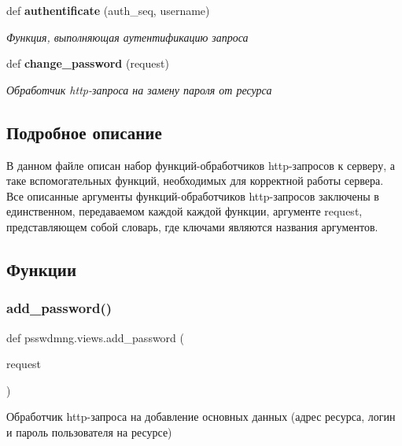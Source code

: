 \begin{DoxyCompactItemize}
def \textbf{ authentificate} (auth\+\_\+seq, username)
\begin{DoxyCompactList}\small\item\em Функция, выполняющая аутентификацию запроса ~\newline
 \end{DoxyCompactList}\item 
def \textbf{ change\+\_\+password} (request)
\begin{DoxyCompactList}\small\item\em Обработчик http-\/запроса на замену пароля от ресурса \end{DoxyCompactList}\end{DoxyCompactItemize}


\subsection{Подробное описание}
\begin{DoxyVerb}В данном файле описан набор функций-обработчиков http-запросов к серверу, а таке вспомогательных функций, необходимых для корректной работы сервера.
Все описанные аргументы функций-обработчиков http-запросов заключены в единственном, передаваемом каждой каждой функции, аргументе request, представляющем
собой словарь, где ключами являются названия аргументов.
\end{DoxyVerb}
 

\subsection{Функции}
\mbox{\label{namespacepsswdmng_1_1views_a7e2a55793835ef1cde007d8d2f6d3520}} 
\subsubsection{add\+\_\+password()}
{\footnotesize\ttfamily def psswdmng.\+views.\+add\+\_\+password (\begin{DoxyParamCaption}\item[{}]{request }\end{DoxyParamCaption})}



Обработчик http-\/запроса на добавление основных данных (адрес ресурса, логин и пароль пользователя на ресурсе) 


